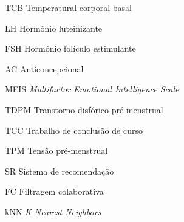 \begin{siglas}
  \item[TCB] Temperatural corporal basal
  \item[LH] Hormônio luteinizante
  \item[FSH] Hormônio folículo estimulante
  \item[AC] Anticoncepcional
  \item[MEIS] \textit{Multifactor Emotional Intelligence Scale}
  \item[TDPM] Transtorno disfórico pré menstrual 
  \item[TCC] Trabalho de conclusão de curso
  \item[TPM] Tensão pré-menstrual  
  \item[SR] Sistema de recomendação
  \item[FC] Filtragem colaborativa
  \item[kNN] \textit{K Nearest Neighbors}
\end{siglas}
